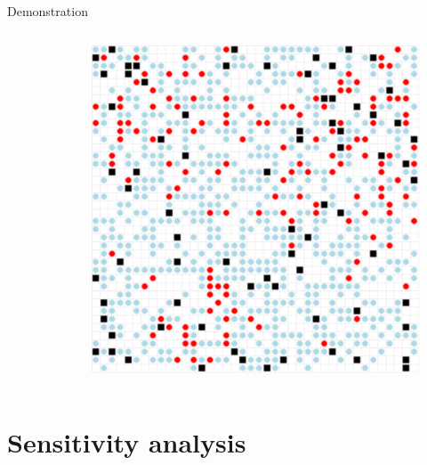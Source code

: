 \documentclass[10pt]{beamer}
\begin{document}
\begin{frame}{Demonstration}
\begin{columns}
\begin{column}{.3\textwidth}
\begin{figure}
                \end{figure}
            \end{column}
            \begin{column}{.3\textwidth}
                \begin{figure}
                    \centering
                    \includegraphics[width=.9\textwidth]{pictures/demonstration/spread_3.png}
                \end{figure}
            \end{column}
        \end{columns}

    \end{frame}

    \section{Sensitivity analysis}
\end{document}
